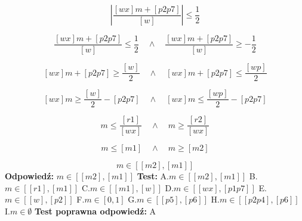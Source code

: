 \documentclass[12pt, a4paper]{article}
\theoremstyle{definition} %
\theoremstyle{definition} %
\newcommand{\rozwStop}{\newline}                                            %
\newcommand{\odpStart}{\noindent \textbf{Odpowiedź:}\newline}    %
\newcommand{\odpStop}{\newline}                                             %
\newcommand{\testStart}{\noindent \textbf{Test:}\newline} %
\newcommand{\testStop}{\newline} %
\newcommand{\kluczStart}{\noindent \textbf{Test poprawna odpowiedź:}\newline} %
\newcommand{\kluczStop}{\newline} %
\begin{document}
$$\left|\frac{[wx]m+[p2p7]}{[w]}\right|\leq\frac{1}{2}$$

$$\frac{[wx]m+[p2p7]}{[w]}\leq\frac{1}{2} \quad \land \quad \frac{[wx]m+[p2p7]}{[w]}\geq -\frac{1}{2}$$

$$[wx]m+[p2p7]\geq \frac{[w]}{2} \quad \land \quad [wx]m+[p2p7]\leq \frac{[wp]}{2} $$

$$[wx]m\geq \frac{[w]}{2} -[p2p7] \quad \land \quad [wx]m\leq \frac{[wp]}{2}-[p2p7] $$

$$m\leq \frac{[r1]}{[wx]} \quad \land \quad m\geq \frac{[r2]}{[wx]} $$

$$m\leq [m1] \quad \land \quad m\geq [m2]$$

$$m\in [[m2], [m1]]$$
\rozwStop
\odpStart
$m\in [[m2], [m1]]$
\odpStop
\testStart
A.$m\in [[m2], [m1]]$
B.$m\in [[r1], [m1]]$
C.$m\in [[m1], [w]]$
D.$m\in [[wx], [p1p7]]$
E.$m\in [[w], [p2]]$
F.$m\in [0, 1]$
G.$m\in [[p5], [p6]]$
H.$m\in [[p2p4], [p6]]$
I.$m\in \emptyset$
\testStop
\kluczStart
A
\kluczStop
\end{document}
